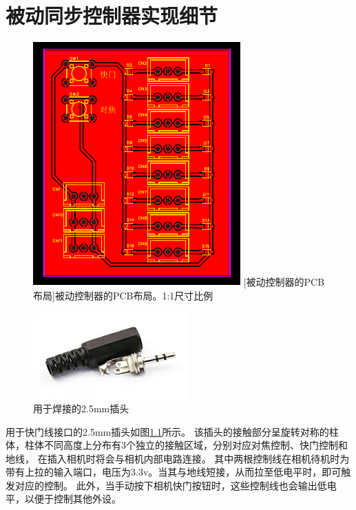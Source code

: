 \chapter{被动同步控制器实现细节}

\begin{figure}
    \begin{minipage}{0.52\textwidth}
        \centering
        \includegraphics{figures/passive_sync_pcb}
        [被动控制器的PCB布局]{被动控制器的PCB布局。1:1尺寸比例}
        \label{fig:passive_sync_pcb}
    \end{minipage}\hfill%
    \begin{minipage}{0.45\textwidth}
        \centering
        \includegraphics{figures/2.5mm}
        \caption{用于焊接的2.5mm插头}
        \label{fig:2.5mm}
    \end{minipage}
\end{figure}
用于快门线接口的2.5mm插头如图\ref{fig:2.5mm}所示。
该插头的接触部分呈旋转对称的柱体，柱体不同高度上分布有3个独立的接触区域，分别对应对焦控制、快门控制和地线，
在插入相机时将会与相机内部电路连接。
其中两根控制线在相机待机时为带有上拉的输入端口，电压为3.3v。当其与地线短接，从而拉至低电平时，即可触发对应的控制。
此外，当手动按下相机快门按钮时，这些控制线也会输出低电平，以便于控制其他外设。

